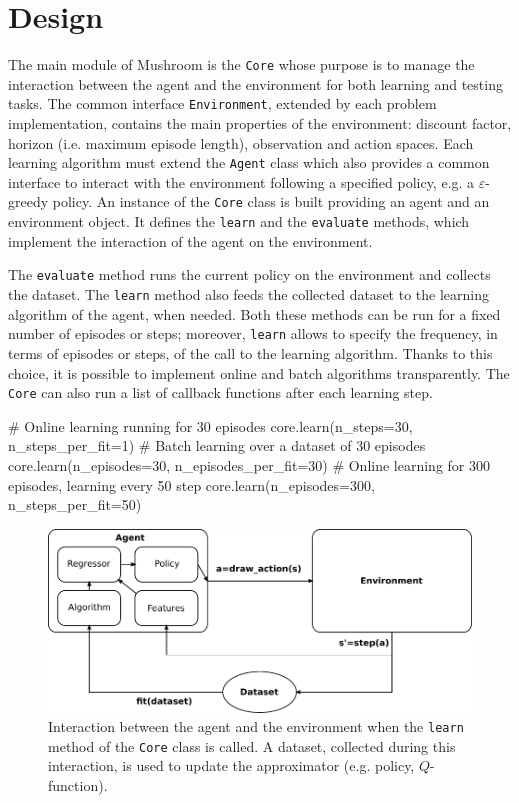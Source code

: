 \section{Design}
The main module of Mushroom is the \texttt{Core} whose purpose is to manage the interaction between the agent and the environment for both learning and testing tasks.
The common interface \texttt{Environment}, extended by each problem implementation, contains the main properties of the environment: discount factor, horizon (i.e. maximum episode length), observation and action spaces.
Each learning algorithm must extend the \texttt{Agent} class which also provides a common interface to interact with the environment following a specified policy, e.g. a $\varepsilon$-greedy policy.
An instance of the \texttt{Core} class is built providing an agent and an environment object. It defines the \texttt{learn} and the \texttt{evaluate} methods, which implement the interaction of the agent on the environment.

The \texttt{evaluate} method runs the current policy on the environment and collects the dataset. The \texttt{learn} method also feeds the collected dataset to the learning algorithm of the agent, when needed. Both these methods can be run for a fixed number of episodes or steps; moreover, \texttt{learn} allows to specify the frequency, in terms of episodes or steps, of the call to the learning algorithm. Thanks to this choice, it is possible to implement online and batch algorithms transparently. The \texttt{Core} can also run a list of callback functions after each learning step.
\begin{python}
# Online learning running for $30$ episodes
core.learn(n_steps=30, n_steps_per_fit=1)
# Batch learning over a dataset of 30 episodes
core.learn(n_episodes=30, n_episodes_per_fit=30)
# Online learning for 300 episodes, learning every 50 step
core.learn(n_episodes=300, n_steps_per_fit=50)
\end{python}
\begin{figure}[t]
\centering
 \includegraphics[width=.8\textwidth]{img/msh.pdf}
 \caption[Agent-environment interaction]{Interaction between the agent and the environment when the \texttt{learn} method of the \texttt{Core} class is called. A dataset, collected during this interaction, is used to update the approximator (e.g. policy, $Q$-function).}
\end{figure}\label{F:core}


